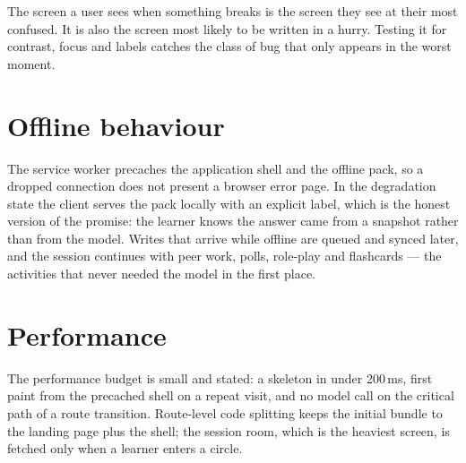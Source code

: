 \begin{note}
The screen a user sees when something breaks is the screen they see at their most
confused. It is also the screen most likely to be written in a hurry. Testing it for
contrast, focus and labels catches the class of bug that only appears in the worst
moment.
\end{note}

\section{Offline behaviour}

The service worker precaches the application shell and the offline pack, so a dropped
connection does not present a browser error page. In the  degradation state the
client serves the pack locally with an explicit  label, which is the
honest version of the promise: the learner knows the answer came from a snapshot rather
than from the model. Writes that arrive while offline are queued and synced later, and the
session continues with peer work, polls, role-play and flashcards --- the activities that
never needed the model in the first place.

\section{Performance}

The performance budget is small and stated: a skeleton in under 200\,ms, first paint from
the precached shell on a repeat visit, and no model call on the critical path of a route
transition. Route-level code splitting keeps the initial bundle to the landing page plus the
shell; the session room, which is the heaviest screen, is fetched only when a learner enters
a circle.
